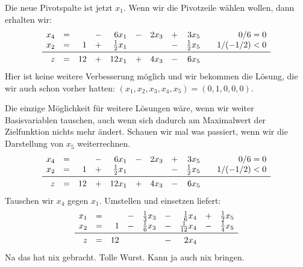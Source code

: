 \documentclass[
a4paper, %
11pt,
]
{scrartcl}
\begin{document}
\begin{description}
    Die neue Pivotspalte ist jetzt $x_1$. Wenn wir die Pivotzeile wählen wollen,
    dann erhalten wir:
    \begin{align*}
      \begin{array}{rcrcrcrcrcr}
        x_4      & = &    & - & 6 x_1           & - & 2 x_3 & + & 3 x_5           &  & 0/6 = 0\\
        x_2      & = & 1  & + & \frac{1}{2} x_1 &   &       & - & \frac{1}{2} x_5 &  & 1/(-1/2) < 0\\
        \midrule
        z        & = & 12 & + & 12 x_1          & + & 4 x_3 & - & 6 x_5
      \end{array}
    \end{align*}
    Hier ist keine weitere Verbesserung möglich und wir bekommen die Lösung, die
    wir auch schon vorher hatten:
    $(x_1, x_2, x_3, x_4, x_5) = (0, 1, 0, 0, 0)$.
\end{description}

Die einzige Möglichkeit für weitere Lösungen wäre, wenn wir weiter
Basisvariablen tauschen, auch wenn sich dadurch am Maximalwert der Zielfunktion
nichts mehr ändert. Schauen wir mal was passiert, wenn wir die Darstellung von
$x_5$ weiterrechnen.
\def\arraystretch{1.5}
\begin{align*}
  \begin{array}{rcrcrcrcrcr}
    x_4      & = &    & - & 6 x_1           & - & 2 x_3 & + & 3 x_5           &  & 0/6 = 0\\
    x_2      & = & 1  & + & \frac{1}{2} x_1 &   &       & - & \frac{1}{2} x_5 &  & 1/(-1/2) < 0\\
    \midrule
    z        & = & 12 & + & 12 x_1          & + & 4 x_3 & - & 6 x_5
  \end{array}
\end{align*}
Tauschen wir $x_4$ gegen $x_1$. Umstellen und einsetzen liefert:
\begin{align*}
  \begin{array}{rcrcrcrcrcr}
    x_1      & = &    & - & \frac{1}{3} x_3 & - & \frac{1}{6} x_4  & + & \frac{1}{2} x_5\\
    x_2      & = & 1  & - & \frac{1}{6} x_3 & - & \frac{1}{12} x_4 & - & \frac{1}{4} x_5\\
    \midrule
    z        & = & 12 &   &                 & - & 2 x_4
  \end{array}
\end{align*}
Na das hat nix gebracht. Tolle Wurst. Kann ja auch nix bringen.
\end{document}
